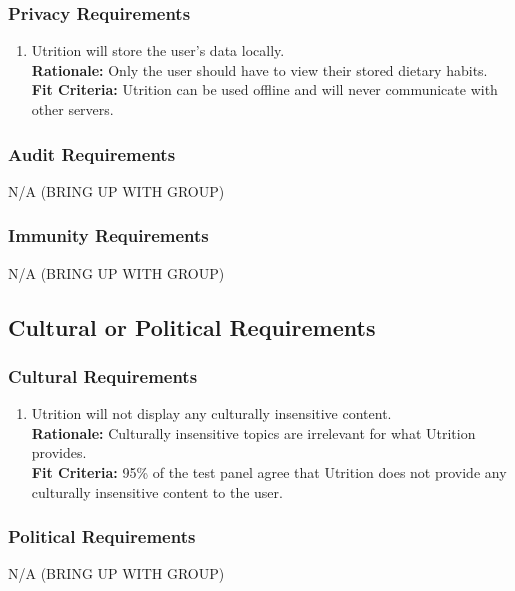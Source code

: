 \documentclass[12pt]{article}
\begin{document}
\subsubsection{Privacy Requirements}
\begin{enumerate}[{SR}3. ] 
	\item Utrition will store the user’s data locally.\\
	\textbf{Rationale:} Only the user should have to view their stored dietary habits. \\	
	\textbf{Fit Criteria:} Utrition can be used offline and will never communicate with other servers.
\end{enumerate}

\subsubsection{Audit Requirements}
\hspace{1.5cm}N/A (BRING UP WITH GROUP) 

\subsubsection{Immunity Requirements}
\hspace{1.5cm}N/A (BRING UP WITH GROUP) 

\subsection{Cultural or Political Requirements}

\subsubsection{Cultural Requirements}

\begin{enumerate}[{CP}1. ] 
	\item Utrition will not display any culturally insensitive content. \\
	\textbf{Rationale:} Culturally insensitive topics are irrelevant for what Utrition provides.\\	
	\textbf{Fit Criteria:} 95\% of the test panel agree that Utrition does not provide any culturally insensitive content to the user.
\end{enumerate}

\subsubsection{Political Requirements}
\hspace{1.5cm}N/A (BRING UP WITH GROUP) 
\end{document}
